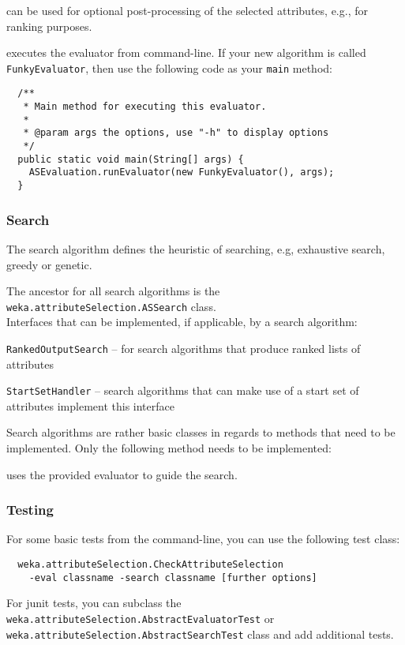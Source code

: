 can be used for optional post-processing of the selected attributes, e.g., for
ranking purposes.

\newpage
{}
executes the evaluator from command-line. If your new algorithm is called
\texttt{FunkyEvaluator}, then use the following code as your \texttt{main}
method:
\begin{verbatim}
  /**
   * Main method for executing this evaluator.
   *
   * @param args the options, use "-h" to display options
   */
  public static void main(String[] args) {
    ASEvaluation.runEvaluator(new FunkyEvaluator(), args);
  }
\end{verbatim}

\subsubsection*{Search}
The search algorithm defines the heuristic of searching, e.g, exhaustive
search, greedy or genetic.

The ancestor for all search algorithms is the
\texttt{weka.attributeSelection.ASSearch} class. \\

\noindent Interfaces that can be implemented, if applicable, by a search
algorithm:
\begin{tight_itemize}
  \item \texttt{RankedOutputSearch} -- for search algorithms that produce
ranked lists of attributes
  \item \texttt{StartSetHandler} -- search algorithms that can make use of a
start set of attributes implement this interface
\end{tight_itemize}

Search algorithms are rather basic classes in regards to methods that need to
be implemented. Only the following method needs to be implemented:

uses the provided evaluator to guide the search.

\subsubsection*{Testing}
For some basic tests from the command-line, you can use the following test
class:
\begin{verbatim}
  weka.attributeSelection.CheckAttributeSelection
    -eval classname -search classname [further options]
\end{verbatim}
For junit tests, you can subclass the
\texttt{weka.attributeSelection.AbstractEvaluatorTest} or
\texttt{weka.attributeSelection.AbstractSearchTest} class and add additional
tests.

